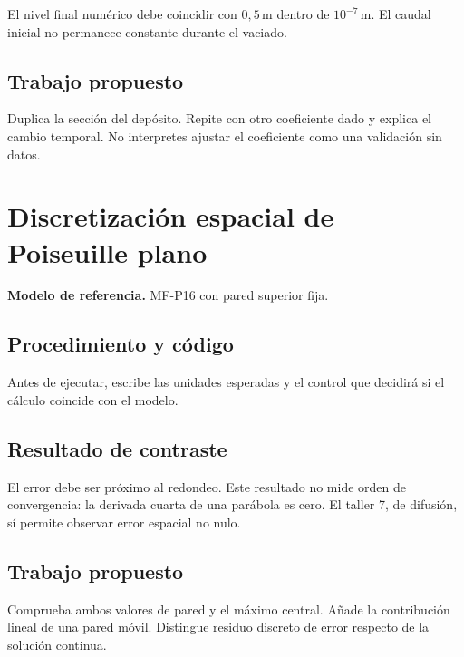El nivel final numérico debe coincidir con $0{,}5\,\mathrm m$ dentro de $10^{-7}\,\mathrm m$. El caudal inicial no permanece constante durante el vaciado.

\section{Trabajo propuesto}

Duplica la sección del depósito. Repite con otro coeficiente dado y explica el cambio temporal. No interpretes ajustar el coeficiente como una validación sin datos.

\studiumchaptercheck

\chapter{Discretización espacial de Poiseuille plano}


\textbf{Modelo de referencia.} MF-P16 con pared superior fija.\par

\section{Procedimiento y código}

Antes de ejecutar, escribe las unidades esperadas y el control que decidirá si el cálculo coincide con el modelo.



\section{Resultado de contraste}

El error debe ser próximo al redondeo. Este resultado no mide orden de convergencia: la derivada cuarta de una parábola es cero. El taller 7, de difusión, sí permite observar error espacial no nulo.

\section{Trabajo propuesto}

Comprueba ambos valores de pared y el máximo central. Añade la contribución lineal de una pared móvil. Distingue residuo discreto de error respecto de la solución continua.

